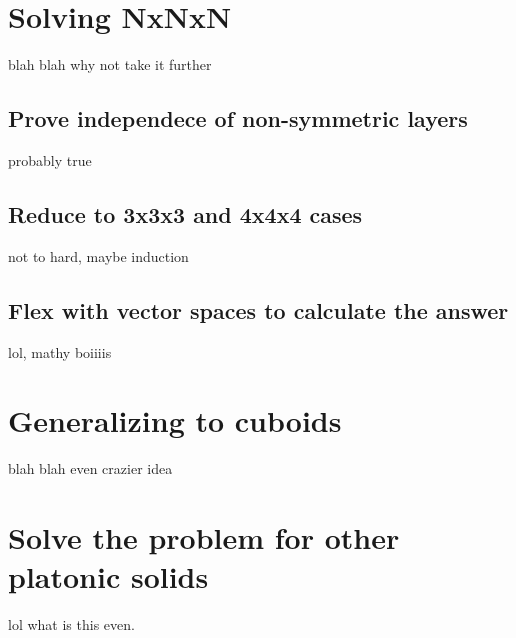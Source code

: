 \documentclass{article}
\begin{document}
    \section{Solving NxNxN}
        blah blah why not take it further

        \subsection{Prove independece of non-symmetric layers}
            probably true

        \subsection{Reduce to 3x3x3 and 4x4x4 cases}
            not to hard, maybe induction

        \subsection{Flex with vector spaces to calculate the answer}
            lol, mathy boiiiis
    
    \section{Generalizing to cuboids}
        blah blah even crazier idea

    \section{Solve the problem for other platonic solids}
        lol what is this even.
\end{document}
